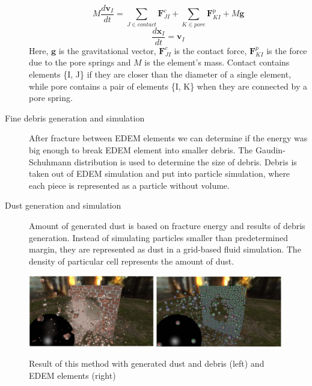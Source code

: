 \begin{description}
\[M\frac{d\mathbf{v}_I}{dt} = \sum_{J \in contact}^{} \mathbf{F}_{JI}^c + \sum_{K \in pore}^{} \mathbf{F}_{KI}^p + M\mathbf{g} \]
\[ \frac{d\mathbf{x}_I}{dt} = \mathbf{v}_I \]
Here, $\mathbf{g}$ is the gravitational vector, $\mathbf{F}^c_{JI}$ is the contact force, $\mathbf{F}^p_{KI}$ is the force due to the pore springs and $\mathit{M}$ is the element’s mass. Contact contains elements \{I, J\} if they are closer than the diameter of a single element, while pore
contains a pair of elements \{I, K\} when they are connected by a pore spring.

\item[Fine debris generation and simulation] After fracture between EDEM elements we can determine if the energy was big enough to break EDEM element into smaller debris. The Gaudin-Schuhmann distribution is used to determine the size of debris. Debris is taken out of EDEM simulation and put into particle simulation, where each piece is represented as a particle without volume.

\item[Dust generation and simulation] Amount of generated dust is based on fracture energy and results of debris generation. Instead of simulating particles smaller than predetermined margin, they are represented as dust in a grid-based fluid simulation. The density of particular cell represents the amount of dust.

\end{description}

 \begin{figure}
        \centering
        \includegraphics[width=0.49\textwidth]{img/edem_real}
        \includegraphics[width=0.49\textwidth]{img/edem}
        \caption{Result of this method with generated dust and debris (left) and EDEM elements (right) \cite{edem}}
        \label{fig:edem}
    \end{figure}
   
